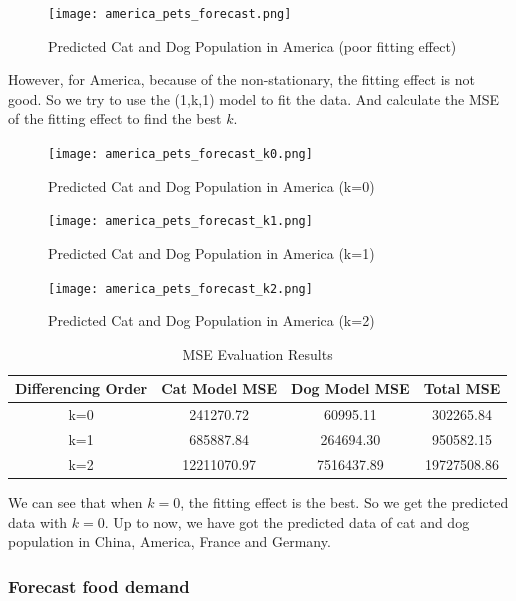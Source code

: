 \documentclass[withoutpreface,bwprint]{cumcmthesis} %
\begin{document}
\clearpage
\begin{figure}[htbp]
	\centering
	\texttt{[image: america\_pets\_forecast.png]}
	\caption{Predicted Cat and Dog Population in America (poor fitting effect)}
\end{figure}
\par However, for America, because of the non-stationary, the fitting effect is not good. 
So we try to use the (1,k,1) model to fit the data.
And calculate the MSE of the fitting effect to find the best \(k\).
\begin{figure}[htbp]
	\centering
	\texttt{[image: america\_pets\_forecast\_k0.png]}
	\caption{Predicted Cat and Dog Population in America (k=0)}
\end{figure}
\clearpage
\begin{figure}[htbp]
	\centering
	\texttt{[image: america\_pets\_forecast\_k1.png]}
	\caption{Predicted Cat and Dog Population in America (k=1)}
\end{figure}
\begin{figure}[htbp]
	\centering
	\texttt{[image: america\_pets\_forecast\_k2.png]}
	\caption{Predicted Cat and Dog Population in America (k=2)}
\end{figure}
\begin{table}[htbp]
\small %
\centering
\caption{MSE Evaluation Results}
\begin{tabular}{cccc}
\toprule
Differencing Order & Cat Model MSE & Dog Model MSE & Total MSE \\
\midrule
k=0 & 241270.72 & 60995.11 & 302265.84 \\
k=1 & 685887.84 & 264694.30 & 950582.15 \\
k=2 & 12211070.97 & 7516437.89 & 19727508.86 \\
\bottomrule
\end{tabular}
\end{table}
\par We can see that when \(k=0\), the fitting effect is the best.
So we get the predicted data with \(k=0\).
Up to now, we have got the predicted data of cat and dog population in China, America, France and Germany.
\subsubsection{Forecast food demand}

\clearpage




\end{document}
